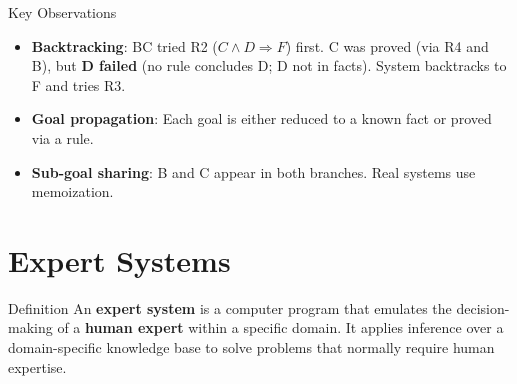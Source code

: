 \documentclass[12pt,a4paper]{article}
\begin{document}
\begin{center}
\end{center}

\begin{keybox}{Key Observations}
\begin{itemize}
  \item \textbf{Backtracking}: BC tried R2 ($C\wedge D\Rightarrow F$) first. C was proved (via R4 and B),
        but \textbf{D failed} (no rule concludes D; D not in facts). System backtracks to F and tries R3.
  \item \textbf{Goal propagation}: Each goal is either reduced to a known fact or proved via a rule.
  \item \textbf{Sub-goal sharing}: B and C appear in both branches. Real systems use memoization.
\end{itemize}
\end{keybox}

\section{Expert Systems}

\begin{defbox}{Definition}
An \textbf{expert system} is a computer program that emulates the decision-making of a
\textbf{human expert} within a specific domain. It applies inference over a domain-specific
knowledge base to solve problems that normally require human expertise.
\end{defbox}
\end{document}
